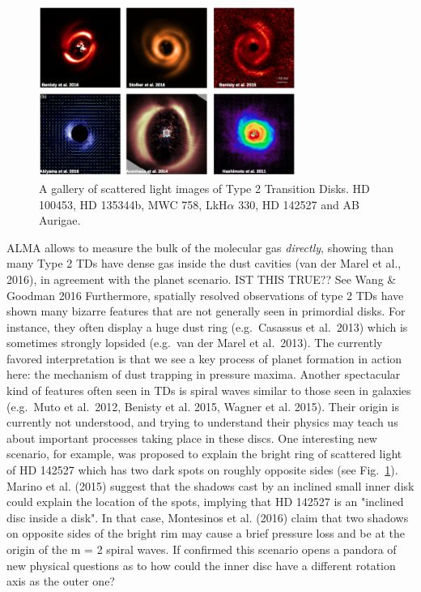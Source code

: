 \documentclass[10pt,fleqn,twoside]{article}
\begin{document}
\begin{figure}
\centerline{\includegraphics[width=0.75\textwidth]{Type2TD_Scat.png}}
\caption{\label{fig-type2-scat}
  A gallery of scattered light images of Type 2 Transition Disks. 
 HD 100453, HD 135344b,
MWC 758, LkH$\alpha$ 330, HD 142527 and AB Aurigae.} 
\end{figure}

ALMA allows to measure the bulk of the molecular gas {\it
  directly}, showing than many Type 2 TDs have dense gas inside the
dust cavities (van der Marel et al., 2016), in agreement with the
planet scenario. {\color{red} IST THIS TRUE?? See Wang \& Goodman 2016}
Furthermore, spatially resolved observations of type
2 TDs have shown many bizarre features that are
not generally seen in primordial disks. For instance, they
  often display a huge dust ring (e.g.~Casassus et al.~2013)
  which is sometimes strongly lopsided (e.g.~van der Marel et al.~2013). The currently favored interpretation is that we see a
  key process of planet formation in action here: the mechanism of dust
  trapping in pressure maxima. Another spectacular kind of features often
  seen in TDs is spiral waves similar to those seen in galaxies
  (e.g.~Muto et al.~2012, Benisty et al. 2015, Wagner et al. 2015). Their origin is currently not
  understood, and trying to understand their physics may teach us about
important processes taking place in these discs. One interesting new
scenario, for example, was proposed to explain the bright ring of scattered light of
HD 142527 which has two dark spots on roughly opposite sides (see Fig.~\ref{fig-type2-scat}). Marino
et al. (2015) suggest that the shadows cast by an inclined small inner
disk could explain the location of the spots, implying that HD 142527
is an "inclined disc inside a disk". In that case, Montesinos et
al. (2016) claim that two shadows on opposite sides of the
bright rim may cause a brief pressure loss and be at the origin of the
m = 2 spiral waves. If confirmed this scenario opens a pandora of new
physical questions as to how could the inner disc have a different
rotation axis as the outer one?  \\
\end{document}

